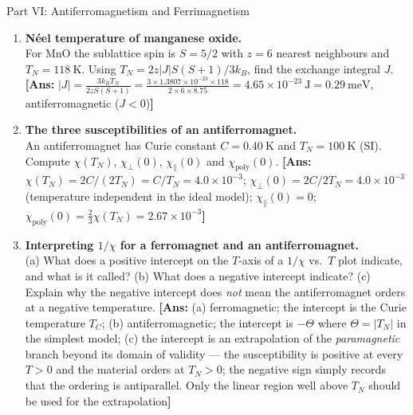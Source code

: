 \documentclass[11pt,a4paper]{article}
\begin{document}
\begin{assignmentbox}{Part VI: Antiferromagnetism and Ferrimagnetism}
\begin{enumerate}[label=\textbf{VI.\arabic*.}, leftmargin=*]
    \item \textbf{N\'eel temperature of manganese oxide.}\\
    For $\text{MnO}$ the sublattice spin is $S = 5/2$ with $z = 6$ nearest neighbours and $T_N = 118\ \mathrm{K}$. Using $T_N = 2z|J|S(S+1)/3k_B$, find the exchange integral $J$.
    \textbf{[Ans:} $|J| = \frac{3k_BT_N}{2zS(S+1)} = \frac{3\times1.3807\times10^{-23}\times118}{2\times6\times8.75} = 4.65\times10^{-23}\ \mathrm{J} = 0.29\ \mathrm{meV}$, antiferromagnetic ($J<0$)\textbf{]}

    \item \textbf{The three susceptibilities of an antiferromagnet.}\\
    An antiferromagnet has Curie constant $C = 0.40\ \mathrm{K}$ and $T_N = 100\ \mathrm{K}$ (SI). Compute $\chi(T_N)$, $\chi_\perp(0)$, $\chi_\parallel(0)$ and $\chi_{\mathrm{poly}}(0)$.
    \textbf{[Ans:} $\chi(T_N) = 2C/(2T_N) = C/T_N = 4.0\times10^{-3}$; $\chi_\perp(0) = 2C/2T_N = 4.0\times10^{-3}$ (temperature independent in the ideal model); $\chi_\parallel(0) = 0$; $\chi_{\mathrm{poly}}(0) = \frac{2}{3}\chi(T_N) = 2.67\times10^{-3}$\textbf{]}

    \item \textbf{Interpreting $1/\chi$ for a ferromagnet and an antiferromagnet.}\\
    (a) What does a positive intercept on the $T$-axis of a $1/\chi$ vs.\ $T$ plot indicate, and what is it called?
    (b) What does a negative intercept indicate?
    (c) Explain why the negative intercept does \emph{not} mean the antiferromagnet orders at a negative temperature.
    \textbf{[Ans:} (a) ferromagnetic; the intercept is the Curie temperature $T_C$; (b) antiferromagnetic; the intercept is $-\Theta$ where $\Theta = |T_N|$ in the simplest model; (c) the intercept is an extrapolation of the \emph{paramagnetic} branch beyond its domain of validity --- the susceptibility is positive at every $T > 0$ and the material orders at $T_N > 0$; the negative sign simply records that the ordering is antiparallel. Only the linear region well above $T_N$ should be used for the extrapolation\textbf{]}


\end{enumerate}
\end{assignmentbox}
\end{document}
